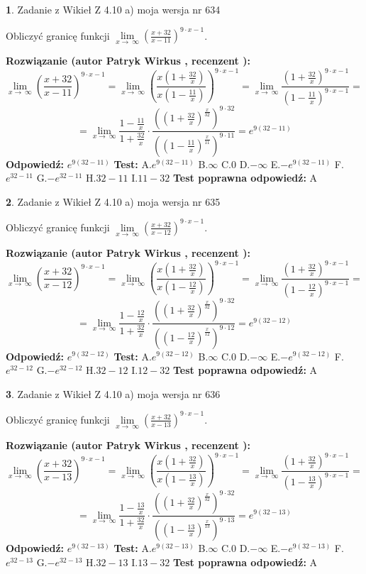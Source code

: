 \documentclass[12pt, a4paper]{article}
\theoremstyle{definition} %
\newtheorem{zad}{}
\newcommand{\zadStart}[1]{\begin{zad}#1\newline}
\newcommand{\zadStop}{\end{zad}}
\newcommand{\rozwStart}[2]{\noindent \textbf{Rozwiązanie (autor #1 , recenzent #2): }\newline}
\newcommand{\rozwStop}{\newline}
\newcommand{\odpStart}{\noindent \textbf{Odpowiedź:}\newline}
\newcommand{\odpStop}{\newline}
\newcommand{\testStart}{\noindent \textbf{Test:}\newline}
\newcommand{\testStop}{\newline}
\newcommand{\kluczStart}{\noindent \textbf{Test poprawna odpowiedź:}\newline}
\newcommand{\kluczStop}{\newline}
\begin{document}
\zadStart{Zadanie z Wikieł Z 4.10 a) moja wersja nr 634}


Obliczyć granicę funkcji  $\lim\limits_{x\to\ \infty}(\frac{x+32}{x-11})^{9\cdot x-1}$.
\zadStop
\rozwStart{Patryk Wirkus}{}
$$\lim\limits_{x\to\ \infty}(\frac{x+32}{x-11})^{9\cdot x-1} = \lim\limits_{x\to\ \infty}(\frac{x(1+\frac{32}{x})}{x(1-\frac{11}{x})})^{9\cdot x-1}=\lim\limits_{x\to\ \infty}\frac{(1+\frac{32}{x})^{9\cdot x-1}}{(1-\frac{11}{x})^{9\cdot x-1}}=$$
$$=\lim\limits_{x\to\ \infty}\frac{1-\frac{11}{x}}{1+\frac{32}{x}}\cdot\frac{((1+\frac{32}{x})^{\frac{x}{32}})^{9\cdot32}}{((1-\frac{11}{x})^{\frac{x}{11}})^{9\cdot11}}=e^{9(32-11)}$$
\rozwStop
\odpStart
$e^{9(32-11)}$
\odpStop
\testStart
A.$e^{9(32-11)}$ B.$\infty$ C.$0$ D.$-\infty$ E.$-e^{9(32-11)}$
F.$e^{32-11}$ G.$-e^{32-11}$
H.$32-11$
I.$11-32$
\testStop
\kluczStart
A
\kluczStop



\zadStart{Zadanie z Wikieł Z 4.10 a) moja wersja nr 635}


Obliczyć granicę funkcji  $\lim\limits_{x\to\ \infty}(\frac{x+32}{x-12})^{9\cdot x-1}$.
\zadStop
\rozwStart{Patryk Wirkus}{}
$$\lim\limits_{x\to\ \infty}(\frac{x+32}{x-12})^{9\cdot x-1} = \lim\limits_{x\to\ \infty}(\frac{x(1+\frac{32}{x})}{x(1-\frac{12}{x})})^{9\cdot x-1}=\lim\limits_{x\to\ \infty}\frac{(1+\frac{32}{x})^{9\cdot x-1}}{(1-\frac{12}{x})^{9\cdot x-1}}=$$
$$=\lim\limits_{x\to\ \infty}\frac{1-\frac{12}{x}}{1+\frac{32}{x}}\cdot\frac{((1+\frac{32}{x})^{\frac{x}{32}})^{9\cdot32}}{((1-\frac{12}{x})^{\frac{x}{12}})^{9\cdot12}}=e^{9(32-12)}$$
\rozwStop
\odpStart
$e^{9(32-12)}$
\odpStop
\testStart
A.$e^{9(32-12)}$ B.$\infty$ C.$0$ D.$-\infty$ E.$-e^{9(32-12)}$
F.$e^{32-12}$ G.$-e^{32-12}$
H.$32-12$
I.$12-32$
\testStop
\kluczStart
A
\kluczStop



\zadStart{Zadanie z Wikieł Z 4.10 a) moja wersja nr 636}


Obliczyć granicę funkcji  $\lim\limits_{x\to\ \infty}(\frac{x+32}{x-13})^{9\cdot x-1}$.
\zadStop
\rozwStart{Patryk Wirkus}{}
$$\lim\limits_{x\to\ \infty}(\frac{x+32}{x-13})^{9\cdot x-1} = \lim\limits_{x\to\ \infty}(\frac{x(1+\frac{32}{x})}{x(1-\frac{13}{x})})^{9\cdot x-1}=\lim\limits_{x\to\ \infty}\frac{(1+\frac{32}{x})^{9\cdot x-1}}{(1-\frac{13}{x})^{9\cdot x-1}}=$$
$$=\lim\limits_{x\to\ \infty}\frac{1-\frac{13}{x}}{1+\frac{32}{x}}\cdot\frac{((1+\frac{32}{x})^{\frac{x}{32}})^{9\cdot32}}{((1-\frac{13}{x})^{\frac{x}{13}})^{9\cdot13}}=e^{9(32-13)}$$
\rozwStop
\odpStart
$e^{9(32-13)}$
\odpStop
\testStart
A.$e^{9(32-13)}$ B.$\infty$ C.$0$ D.$-\infty$ E.$-e^{9(32-13)}$
F.$e^{32-13}$ G.$-e^{32-13}$
H.$32-13$
I.$13-32$
\testStop
\kluczStart
A
\kluczStop
\end{document}
